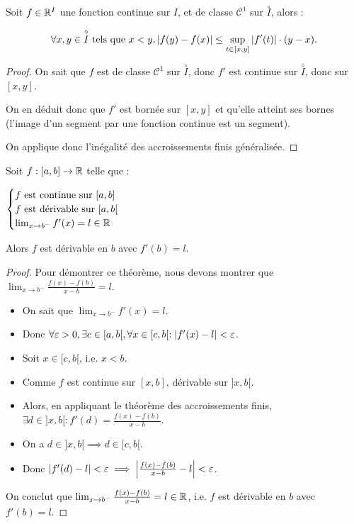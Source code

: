 \documentclass[12pt, a4paper]{report}
\begin{document}
\begin{consequence}
  Soit $f \in \mathbb{R}^I$ une fonction continue sur $I$, et de classe $\mathcal{C}^1$ sur $\overset{\circ}{I}$, alors :

  $$\forall x,y \in \overset{\circ}{I}\text{ tels que } x<y, \left|f(y)-f(x)\right| \leq \sup_{t\in[x,y]} |f'(t)| \cdot (y-x).$$
\end{consequence}

\begin{proof}
  On sait que $f$ est de classe $\mathcal{C}^1$ sur $\overset{\circ}{I}$, donc $f'$ est continue sur $\overset{\circ}{I}$, donc sur $[x,y]$.

  On en déduit donc que $f'$ est bornée sur $[x,y]$ et qu'elle atteint ses bornes (l'image d'un segment par une fonction continue est un segment).

  On applique donc l'inégalité des accroissements finis généralisée.
\end{proof}

\begin{theorem}
    Soit $f:[a,b]\to\mathbb{R}$ telle que :

    $\begin{cases}
        f \text{ est continue sur } [a,b]\\
        f \text{ est dérivable sur } [a,b[\\
        \lim_{x\to b^-}f'(x)=l\in\mathbb{R}
    \end{cases}$

    Alors $f$ est dérivable en $b$ avec $f'(b)=l$.
\end{theorem}

\begin{proof}
    Pour démontrer ce théorème, nous devons montrer que $\lim_{x\to b^-}\frac{f(x)-f(b)}{x-b} =l$.

    \begin{itemize}
        \item On sait que $\lim_{x\to b^-}f'(x)=l$.

        \item Donc $\forall \varepsilon > 0, \exists c \in [a,b[, \forall x \in [c,b[ : \left|f'(x)-l\right|<\varepsilon$.

        \item Soit $x\in[c,b[$, i.e. $x<b$.
    
        \item Comme $f$ est continue sur $[x,b]$, dérivable sur $]x,b[$.
    
        \item Alors, en appliquant le théorème des accroissements finis, $\exists d \in ]x,b[ : f'(d)=\frac{f(x)-f(b)}{x-b}$.
    
        \item On a $d \in ]x,b[ \implies d\in [c,b[$.
    
        \item Donc $\left|f'(d)-l\right| < \varepsilon \implies \left|\frac{f(x)-f(b)}{x-b} -l\right| < \varepsilon$.
    \end{itemize}

    On conclut que $\lim_{x\to b^-} \frac{f(x)-f(b)}{x-b}=l\in\mathbb{R}$, i.e. $f$ est dérivable en $b$ avec $f'(b)=l$.
\end{proof}
\end{document}
